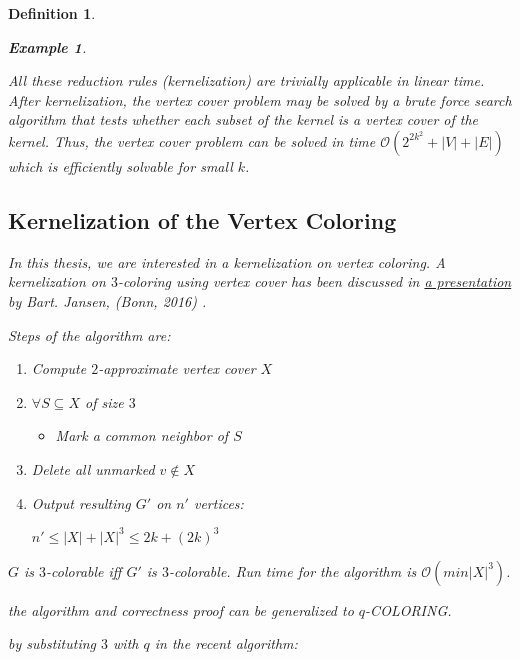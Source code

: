 \documentclass[12pt]{article}
\theoremstyle{slplain}
\newtheorem{defi}{Definition}
\newtheorem{exam}{Example}
\begin{document}
\begin{defi}
\begin{exam}
\begin{itemize}
  
\end{itemize}



All these reduction rules (kernelization) are trivially applicable in linear time. After kernelization, the vertex cover problem may be solved by a brute force search algorithm that tests whether each subset of the kernel is a vertex cover of the kernel. Thus, the vertex cover problem can be solved in time $\mathcal{O}(2^{2k^2} + |V| + |E|)$ which is efficiently solvable for small $k$.
\end{exam}

\newpage
\subsection{Kernelization of the Vertex Coloring}

In this thesis, we are interested in a kernelization on vertex coloring. 
A kernelization on $3$-coloring using vertex cover has been discussed in \href{https://onedrive.live.com/view.aspx?resid=D39E73028C0B20E6!2586&ithint=file%2cpptx&app=PowerPoint&authkey=!AFs8zyWC8bfQ0PA}{a presentation} by Bart. Jansen, (Bonn, 2016) \cite{bart}.

Steps of the algorithm are:

\begin{enumerate}
\item Compute $2$-approximate vertex cover $X$

\item $\forall S\subseteq X$ of size $3$
\begin{itemize}
\item Mark a common neighbor of $S$
\end{itemize}
\item Delete all unmarked $v \not\in X$

\item Output resulting $G'$ on $n'$ vertices:

\begin{center}
$n' \leq |X| + |X|^3 \leq 2k + (2k)^3$
\end{center}
\end{enumerate}

$G$ is $3$-colorable iff $G'$ is $3$-colorable. Run time for the algorithm is $\mathcal{O}(min|X|^3)$.

the algorithm and correctness proof can be generalized to $q$-COLORING. \cite{kra}


by substituting $3$ with $q$ in the recent algorithm:


\end{defi}
\end{document}
